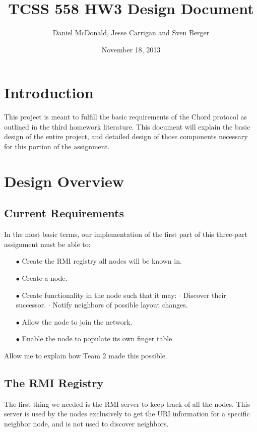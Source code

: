 \documentclass{scrartcl}
\title{\Large TCSS 558 HW3 Design Document}
\author{Daniel McDonald, Jesse Carrigan and Sven Berger}
\date{November 18, 2013}
\begin{document}
\maketitle
\section*{Introduction}
\par This project is meant to fulfill the basic requirements of the Chord protocol as outlined in the third homework literature. This document will explain the basic design of the entire project, and detailed design of those components necessary for this portion of the assignment.
\section*{Design Overview}
\subsection*{Current Requirements}
\indent In the most basic terms, our implementation of the first part of this three-part assignment must be able to:
\begin{itemize}[leftmargin=1cm]
\itemsep0em
  \item[$\bullet$]Create the RMI registry all nodes will be known in.
  \item[$\bullet$]Create a node.
  \item[$\bullet$]Create functionality in the node such that it may:
  \subitem$\cdot$ Discover their successor.
  \subitem$\cdot$ Notify neighbors of possible layout changes.
  \item[$\bullet$]Allow the node to join the network.
  \item[$\bullet$]Enable the node to populate its own finger table.
\end{itemize}
\par Allow me to explain how Team 2 made this possible.
\subsection*{The RMI Registry}
\par The first thing we needed is the RMI server to keep track of all the nodes. This server is used by the nodes exclusively to get the URI information for a specific neighbor node, and is not used to discover neighbors.
\end{document}
